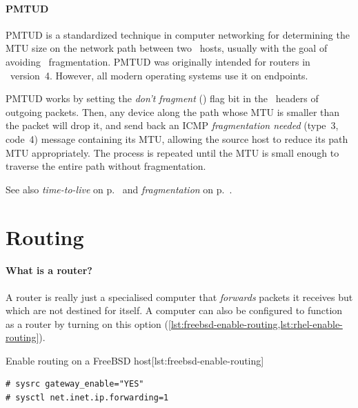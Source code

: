 

\paragraph{\acl{PMTUD}}
\label{par:pmtud}

\Acf{PMTUD} is a standardized technique in computer networking for determining the \acf{MTU} size on the network path between two \IP\ hosts, usually with the goal of avoiding \IP\ fragmentation.
\Acl{PMTUD} was originally intended for routers in \IP\ version~4.
However, all modern operating systems use it on endpoints.

\Acl{PMTUD} works by setting the \emph{don't fragment} () flag bit in the \IP\ headers of outgoing packets.
Then, any device along the path whose \acs{MTU} is smaller than the packet will drop it, and send back an \acs{ICMP} \emph{fragmentation needed} (type~3, code~4) message containing its \acs{MTU}, allowing the source host to reduce its path \acs{MTU} appropriately.
The process is repeated until the \acs{MTU} is small enough to traverse the entire path without fragmentation.

See also \emph{time-to-live} on p.~\pageref{par:ip-ttl} and \emph{fragmentation} on p.~\pageref{par:ip-fragmentation}.







\section{Routing}
\label{sec:ip-routing}

\paragraph{What is a router?}
A router is really just a specialised computer that \emph{forwards} packets it receives but which are not destined for itself.
A computer can also be configured to function as a router by turning on this option (\vref{lst:freebsd-enable-routing,lst:rhel-enable-routing}).


\begin{fltlisting}[h!]
\begin{sidecaption}{Enable routing on a FreeBSD host}[lst:freebsd-enable-routing]
\begin{lstlisting}
# sysrc gateway_enable="YES"
# sysctl net.inet.ip.forwarding=1
\end{lstlisting}
\end{sidecaption}
\end{fltlisting}

